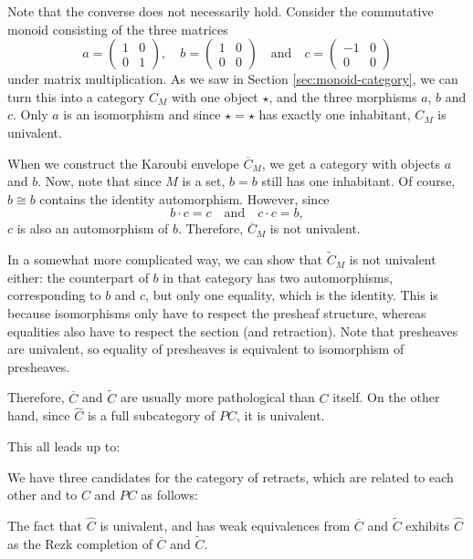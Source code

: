 \begin{remark}
  Note that the converse does not necessarily hold. Consider the commutative monoid consisting of the three matrices
  \[
    a = \begin{pmatrix}
      1 & 0\\0 & 1
    \end{pmatrix}, \quad
    b = \begin{pmatrix}
      1 & 0\\0 & 0
    \end{pmatrix} \quad \text{and} \quad
    c = \begin{pmatrix}
      -1 & 0\\0 & 0
    \end{pmatrix}
  \]
  under matrix multiplication. As we saw in Section \ref{sec:monoid-category}, we can turn this into a category $ C_M $ with one object $ \star $, and the three morphisms $ a $, $ b $ and $ c $. Only $ a $ is an isomorphism and since $ \star = \star $ has exactly one inhabitant, $ C_M $ is univalent.

  When we construct the Karoubi envelope $ \overline C_M $, we get a category with objects $ a $ and $ b $. Now, note that since $ M $ is a set, $ b = b $ still has one inhabitant. Of course, $ b \cong b $ contains the identity automorphism. However, since
  \[ b \cdot c = c \quad \text{and} \quad c \cdot c = b, \]
  $ c $ is also an automorphism of $ b $. Therefore, $ \overline C_M $ is not univalent.

  In a somewhat more complicated way, we can show that $ \tilde C_M $ is not univalent either: the counterpart of $ b $ in that category has two automorphisms, corresponding to $ b $ and $ c $, but only one equality, which is the identity. This is because isomorphisms only have to respect the presheaf structure, whereas equalities also have to respect the section (and retraction). Note that presheaves are univalent, so equality of presheaves is equivalent to isomorphism of presheaves.

  Therefore, $ \overline C $ and $ \tilde C $ are usually more pathological than $ C $ itself. On the other hand, since $ \hat C $ is a full subcategory of $ PC $, it is univalent.
\end{remark}

This all leads up to:
\begin{corollary}
  We have three candidates for the category of retracts, which are related to each other and to $ C $ and $ PC $ as follows:
  \begin{center}
  \end{center}
  The fact that $ \hat C $ is univalent, and has weak equivalences from $ \overline C $ and $ \tilde C $ exhibits $ \hat C $ as the Rezk completion of $ \overline C $ and $ \tilde C $.
\end{corollary}

